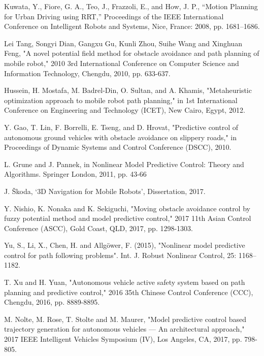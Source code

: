 \documentclass[conference,11pt]{IEEEtran}
\begin{document}
\begin{thebibliography}{00}
	
	Kuwata, Y., Fiore, G. A., Teo, J., Frazzoli, E., and How, J. P., “Motion Planning for Urban Driving using RRT,” Proceedings of the IEEE International Conference on Intelligent Robots and Systems, Nice, France: 2008, pp. 1681–1686.
	
	Lei Tang, Songyi Dian, Gangxu Gu, Kunli Zhou, Suihe Wang and Xinghuan Feng, "A novel potential field method for obstacle avoidance and path planning of mobile robot," 2010 3rd International Conference on Computer Science and Information Technology, Chengdu, 2010, pp. 633-637.
	
	Hussein, H. Mostafa, M. Badrel-Din, O. Sultan, and A. Khamis, "Metaheuristic optimization approach to mobile robot path planning," in 1st International Conference on Engineering and Technology (ICET), New Cairo, Egypt, 2012.
	
	Y. Gao, T. Lin, F. Borrelli, E. Tseng, and D. Hrovat, "Predictive control of autonomous ground vehicles with obstacle avoidance on slippery roads," in Proceedings of Dynamic Systems and Control Conference (DSCC), 2010.
	
	L. Grune and J. Pannek, in Nonlinear Model Predictive Control: Theory and Algorithms. Springer London, 2011, pp. 43-66
	
	J. Škoda, ‘3D Navigation for Mobile Robots’, Dissertation, 2017.
	
	Y. Nishio, K. Nonaka and K. Sekiguchi, "Moving obstacle avoidance control by fuzzy potential method and model predictive control," 2017 11th Asian Control Conference (ASCC), Gold Coast, QLD, 2017, pp. 1298-1303.
	
	Yu, S., Li, X., Chen, H. and Allgöwer, F. (2015), "Nonlinear model predictive control for path following problems". Int. J. Robust Nonlinear Control, 25: 1168–1182. 
	
	T. Xu and H. Yuan, "Autonomous vehicle active safety system based on path planning and predictive control," 2016 35th Chinese Control Conference (CCC), Chengdu, 2016, pp. 8889-8895.
	
	M. Nolte, M. Rose, T. Stolte and M. Maurer, "Model predictive control based trajectory generation for autonomous vehicles — An architectural approach," 2017 IEEE Intelligent Vehicles Symposium (IV), Los Angeles, CA, 2017, pp. 798-805.
	

\end{thebibliography}
\end{document}
